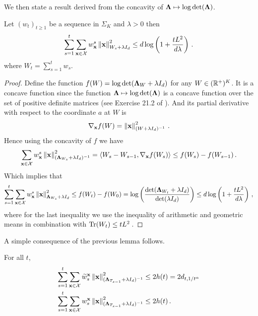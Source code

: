We then state a result derived from the concavity of ${\boldsymbol \Lambda}\mapsto \log\det({\boldsymbol \Lambda})$.
\begin{lemma}
\label{lem:sum_w_norm_a}
Let $(w_t)_{t\geq 1}$ be a sequence in $\Sigma_K$ and $\lambda>0$ then
\[
\sum_{s=1}^t \sum_{{\bf x}\in\mathcal{X}} w_{{\bf x}}^s \left\lVert{\bf x}\right\rVert^2_{W_s +\lambda I_d} \leq d \log\left(1 +\frac{t L^2}{d \lambda}\right)\,.
\]
where $W_t = \sum_{s=1}^t w_s$.
\end{lemma}
\begin{proof}
Define the function $f(W)= \log\det({\boldsymbol \Lambda}_W+\lambda I_d)$ for any $W\in(\mathbb{R}^+)^K$. It is a concave function since the function
${\boldsymbol \Lambda}\mapsto \log\det({\boldsymbol \Lambda})$ is a concave function over the set of positive definite matrices (see Exercise 21.2 of \citealt{lattimore2018bandits}). And its partial derivative with respect to the coordinate $a$ at $W$ is
\[
\nabla_{{\bf x}} f(W) = \left\lVert{\bf x}\right\rVert^2_{(W+\lambda I_d)^{-1}}\,.
\]
Hence using the concavity of $f$ we have
\begin{align*}
  \sum_{{\bf x}\in\mathcal{X}} w_{{\bf x}}^s \left\lVert{\bf x}\right\rVert^2_{({\boldsymbol \Lambda}_{W_s} +\lambda I_d)^{-1}} = \langle W_s - W_{s-1}, \nabla_{{\bf x}} f(W_s) \rangle \leq f(W_s) - f(W_{s-1})\,.
\end{align*}
Which implies that
\begin{align*}
  \sum_{s=1}^t \sum_{{\bf x}\in\mathcal{X}} w_{{\bf x}}^s \left\lVert{\bf x}\right\rVert^2_{{\boldsymbol \Lambda}_{W_s} +\lambda I_d} \leq f(W_t)-f(W_0) = \log\left(\frac{\det({\boldsymbol \Lambda}_{W_t} +\lambda I_d) }{\det(\lambda I_d)}\right) \leq d \log\left(1 +\frac{t L^2}{d \lambda}\right)\,,
\end{align*}
where for the last inequality we use the inequality of arithmetic and geometric means in combination with $\operatorname{\mathrm{Tr}}(W_t) \leq t L^2$\,.
\end{proof}

A simple consequence of the previous lemma follows.
\begin{lemma} For all $t$,
\label{lem:computation_sum_w_a_N}
\begin{align*}
\sum_{s=1}^t \sum_{{\bf x}\in\mathcal{X}} \widetilde{w}_s^{{\bf x}} \left\lVert{\bf x}\right\rVert_{({\boldsymbol \Lambda}_{T_{s-1}}+\lambda I_d)^{-1}}^2 &\leq 2h(t) = 2d_{t,1/t^\alpha} \\
\sum_{s=1}^t \sum_{{\bf x}\in\mathcal{X}} w_s^{{\bf x}} \left\lVert{\bf x}\right\rVert_{({\boldsymbol \Lambda}_{T_{s-1}}+\lambda I_d)^{-1}}^2 &\leq 2h(t)\,.
\end{align*}
\end{lemma}

